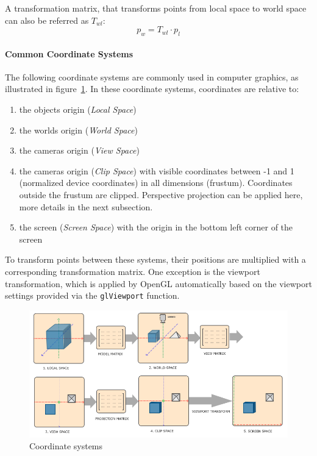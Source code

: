 A transformation matrix, that transforms points from local space to world space can also be referred as $T_{wl}$:
\begin{equation}
    p_w = T_{wl} \cdot p_l
\end{equation}

\paragraph{Common Coordinate Systems}\label{sec:coordinate-systems}
The following coordinate systems are commonly used in computer graphics, as illustrated in figure~\ref{fig:coordinate-systems}.
In these coordinate systems, coordinates are relative to:
\begin{enumerate}
    \item the objects origin (\textit{Local Space})
    \item the worlds origin (\textit{World Space})
    \item the cameras origin (\textit{View Space})
    \item the cameras origin (\textit{Clip Space}) with visible coordinates between -1 and 1 (normalized device coordinates) in all dimensions (frustum).
    Coordinates outside the frustum are clipped.
    Perspective projection can be applied here, more details in the next subsection.
    \item the screen (\textit{Screen Space})  with the origin in the bottom left corner of the screen
\end{enumerate}
To transform points between these systems, their positions are multiplied with a corresponding transformation matrix.
One exception is the viewport transformation,
which is applied by OpenGL automatically based on the viewport settings provided via the \texttt{glViewport} function.

\begin{figure}[h!]
    \centering
    \includegraphics[width=\linewidth]{images/coordinate_systems}
    \caption{Coordinate systems}
    \label{fig:coordinate-systems}
\end{figure}

